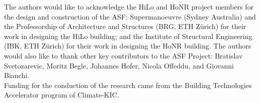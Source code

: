 
The authors would like to acknowledge the HiLo and HoNR project members for the design and construction of the ASF: Supermanoeuvre (Sydney Australia) and the Professorship of Architecture and Structures (BRG, ETH Zürich) for their work in designing the HiLo building; and the Institute of Structural Engineering (IBK, ETH Zürich) for their work in designing the HoNR building. The authors would also like to thank other key contributors to the ASF Project: Bratislav Svetozarevic, Moritz Begle, Johannes Hofer, Nicola Offeddu, and Giovanni Bianchi. \\

Funding for the conduction of the research came from the Building Technologies Accelerator program of Climate-KIC.